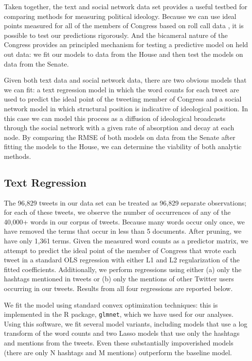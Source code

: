 \documentclass[10pt]{article}
\begin{document}
Taken together, the text and social network data set provides a useful testbed for comparing methods for measuring political ideology. Because we can use ideal points measured for all of the members of Congress based on roll call data \citep{Jackman_2001}, it is possible to test our predictions rigorously. And the bicameral nature of the Congress provides an principled mechanism for testing a predictive model on held out data: we fit our models to data from the House and then test the models on data from the Senate.

Given both text data and social network data, there are two obvious models that we can fit: a text regression model in which the word counts for each tweet are used to predict the ideal point of the tweeting member of Congress and a social network model in which structural position is indicative of ideological position.  In this case we can model this process as a diffusion of ideological broadcasts through the social network with a given rate of absorption and decay at each node. By comparing the RMSE of both models on data from the Senate after fitting the models to the House, we can determine the viability of both analytic methods.

\subsection{Text Regression}


The 96,829 tweets in our data set can be treated as 96,829 separate observations; for each of these tweets, we observe the number of occurrences of any of the 40,000+ words in our corpus of tweets. Because many words occur only once, we have removed the terms that occur in less than 5 documents. After pruning, we have only 1,361 terms. Given the measured word counts as a predictor matrix, we attempt to predict the ideal point of the member of Congress that wrote each tweet in a standard OLS regression with either L1 and L2 regularization of the fitted coefficients. Additionally, we perform regressions using either (a) only the hashtags mentioned in tweets or (b) only the mentions of other Twitter users occurring in our tweets. Results from all four regressions are reported below.

We fit the model using standard convex optimization techniques: this is implemented in the R package, \texttt{glmnet}, which we have used for our analyses. Using this software, we fit several model variants, including models that use a log transform of the word counts and two Lasso models that use only the hashtags and mentions from the tweets. Even these substantially impoverished models (there are only N hashtags and M mentions) outperform the baseline model.
\end{document}
